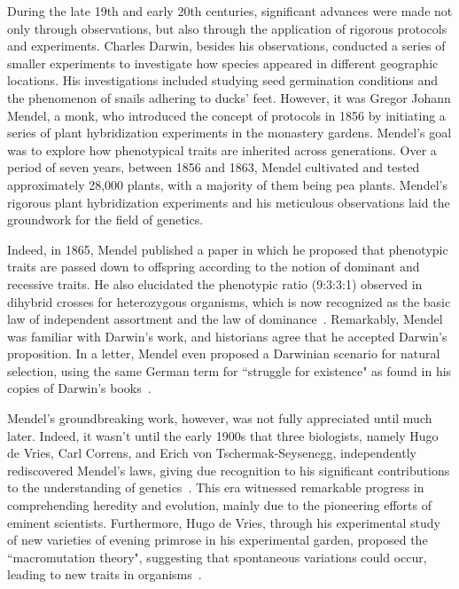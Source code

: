 During the late 19th and early 20th centuries, significant advances were made not only through observations, but also through the application of rigorous protocols and experiments. Charles Darwin, besides his observations, conducted a series of smaller experiments to investigate how species appeared in different geographic locations. His investigations included studying seed germination conditions and the phenomenon of snails adhering to ducks' feet. However, it was Gregor Johann Mendel, a monk, who introduced the concept of protocols in 1856 by initiating a series of plant hybridization experiments in the monastery gardens. Mendel's goal was to explore how phenotypical traits are inherited across generations. Over a period of seven years, between 1856 and 1863, Mendel cultivated and tested approximately 28,000 plants, with a majority of them being pea plants. Mendel's rigorous plant hybridization experiments and his meticulous observations laid the groundwork for the field of genetics.

Indeed, in 1865, Mendel published a paper in which he proposed that phenotypic traits are passed down to offspring according to the notion of dominant and recessive traits. He also elucidated the phenotypic ratio (9:3:3:1) observed in dihybrid crosses for heterozygous organisms, which is now recognized as the basic law of independent assortment and the law of dominance~\citep{mendel_versuche_1865}. Remarkably, Mendel was familiar with Darwin's work, and historians agree that he accepted Darwin's proposition. In a letter, Mendel even proposed a Darwinian scenario for natural selection, using the same German term for “struggle for existence" as found in his copies of Darwin's books~\citep{fairbanks_mendel_2020, berry_mendel_2022}. 

Mendel's groundbreaking work, however, was not fully appreciated until much later. Indeed, it wasn't until the early 1900s that three biologists, namely Hugo de Vries, Carl Correns, and Erich von Tschermak-Seysenegg, independently rediscovered Mendel's laws, giving due recognition to his significant contributions to the understanding of genetics~\citep{keynes_william_2008}. This era witnessed remarkable progress in comprehending heredity and evolution, mainly due to the pioneering efforts of eminent scientists. Furthermore, Hugo de Vries, through his experimental study of new varieties of evening primrose in his experimental garden, proposed the “macromutation theory", suggesting that spontaneous variations could occur, leading to new traits in organisms~\citep{vries_mutationstheorie_1901}.

